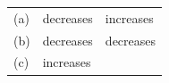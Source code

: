 \begin{enumerate}[noitemsep, label=\textbf{\arabic*}. ]
\begin{enumerate}[noitemsep, label=\textbf{\alph*}. ]
{{\begin{center}
\begin{tabular}[t]{|l|l|l|}
    
        (a) &
    
    
        decreases &
    
    
        increases%
     \tabularnewline\cline{1-1}\cline{2-2}\cline{3-3}
    
    
        (b) &
    
    
        decreases &
    
    
        decreases%
     \tabularnewline\cline{1-1}\cline{2-2}\cline{3-3}
    
    
        (c) &
    
    
        increases &
    
    

\end{tabular}
\end{center}}}
\end{enumerate}
\end{enumerate}
